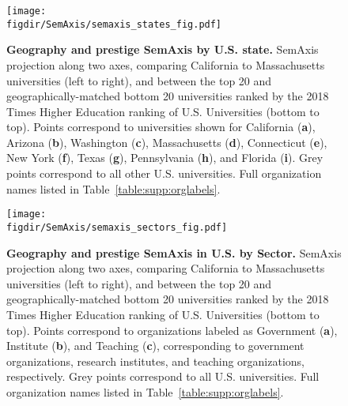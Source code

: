 \documentclass[12pt]{article} %
\def\figdir{../Figs}
\begin{document}
%
%
\begin{figure}[hp!]
	\centering
	\texttt{[image: \\figdir/SemAxis/semaxis\_states\_fig.pdf]}
	\caption{
		\textbf{Geography and prestige SemAxis by U.S. state.}
		SemAxis projection along two axes, comparing California to Massachusetts universities (left to right), and between the top 20 and geographically-matched bottom 20 universities ranked by the 2018 Times Higher Education ranking of U.S. Universities (bottom to top).
		Points correspond to universities shown for California (\textbf{a}), Arizona (\textbf{b}), Washington (\textbf{c}), Massachusetts (\textbf{d}), Connecticut (\textbf{e}), New York (\textbf{f}), Texas (\textbf{g}), Pennsylvania (\textbf{h}), and Florida (\textbf{i}).
		Grey points correspond to all other U.S. universities.
		Full organization names listed in Table~\ref{table:supp:orglabels}.
	}
	\label{fig:supp:semaxis_states}
\end{figure}


%
%
\begin{figure}[hp!]
	\centering
	\texttt{[image: \\figdir/SemAxis/semaxis\_sectors\_fig.pdf]}
	\caption{
		\textbf{Geography and prestige SemAxis in U.S. by Sector.}
		SemAxis projection along two axes, comparing California to Massachusetts universities (left to right), and between the top 20 and geographically-matched bottom 20 universities ranked by the 2018 Times Higher Education ranking of U.S. Universities (bottom to top).
		Points correspond to organizations labeled as Government (\textbf{a}), Institute (\textbf{b}), and Teaching (\textbf{c}), corresponding to government organizations, research institutes, and teaching organizations, respectively.
		Grey points correspond to all U.S. universities.
	    	Full organization names listed in Table~\ref{table:supp:orglabels}.
	}
	\label{fig:supp:semaxis_sectors}
\end{figure}




\clearpage
\printbibliography{}
\end{document}
